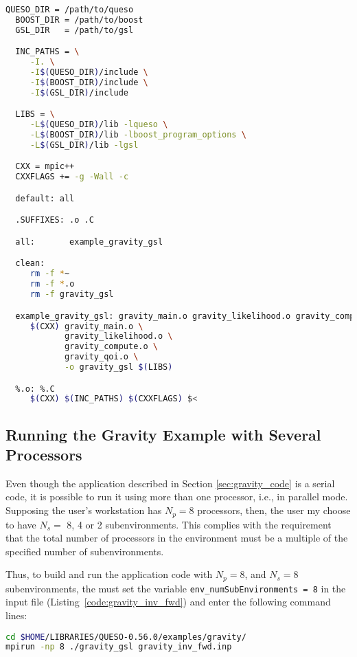 \begin{lstlisting}[caption={Makefile for the application code in Listings
  \ref{code:gravity_main}-\ref{code:gravity_like_C}},
  label={code:makefile},
  language={bash}]
  QUESO_DIR = /path/to/queso
  BOOST_DIR = /path/to/boost
  GSL_DIR   = /path/to/gsl

  INC_PATHS = \
     -I. \
     -I$(QUESO_DIR)/include \
     -I$(BOOST_DIR)/include \
     -I$(GSL_DIR)/include

  LIBS = \
     -L$(QUESO_DIR)/lib -lqueso \
     -L$(BOOST_DIR)/lib -lboost_program_options \
     -L$(GSL_DIR)/lib -lgsl

  CXX = mpic++
  CXXFLAGS += -g -Wall -c

  default: all

  .SUFFIXES: .o .C

  all:       example_gravity_gsl

  clean:
     rm -f *~
     rm -f *.o
     rm -f gravity_gsl

  example_gravity_gsl: gravity_main.o gravity_likelihood.o gravity_compute.o gravity_qoi.o
     $(CXX) gravity_main.o \
            gravity_likelihood.o \
            gravity_compute.o \
            gravity_qoi.o \
            -o gravity_gsl $(LIBS)

  %.o: %.C
     $(CXX) $(INC_PATHS) $(CXXFLAGS) $<
\end{lstlisting}

\subsection{Running the Gravity Example with Several Processors}

Even though the application described in Section \ref{sec:gravity_code} is a serial code, it is
possible to run it using more than one processor, i.e., in parallel mode.
Supposing the user's workstation has $N_p=8$ processors, then, the user my choose to have $N_s =$
8, 4 or 2 subenvironments. This complies with the requirement that the total number of processors
in the environment must be a multiple of the specified number of subenvironments.

Thus, to build and run the application code with $N_p = 8$, and $N_s=8$ subenvironments, the must
set the variable \texttt{env\_numSubEnvironments = 8} in the input file
(Listing~\ref{code:gravity_inv_fwd}) and enter the following command lines:



\begin{lstlisting}[caption={}, label={},language={bash}]
cd $HOME/LIBRARIES/QUESO-0.56.0/examples/gravity/
mpirun -np 8 ./gravity_gsl gravity_inv_fwd.inp
\end{lstlisting}


